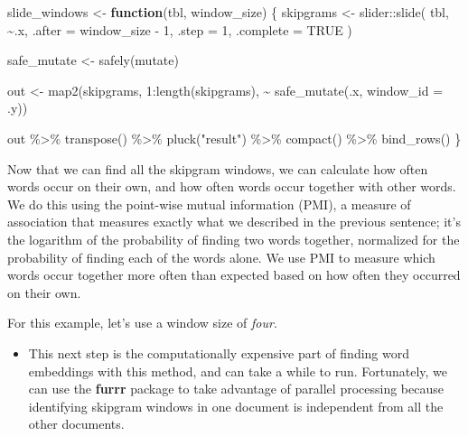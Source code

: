 \documentclass[
]{krantz}
\makeatletter
\newenvironment{Shaded}{\begin{snugshade}}{\end{snugshade}}
\newcommand{\AttributeTok}[1]{\textcolor[rgb]{0.77,0.63,0.00}{#1}}
\newcommand{\ConstantTok}[1]{\textcolor[rgb]{0.00,0.00,0.00}{#1}}
\newcommand{\ControlFlowTok}[1]{\textcolor[rgb]{0.13,0.29,0.53}{\textbf{#1}}}
\newcommand{\DecValTok}[1]{\textcolor[rgb]{0.00,0.00,0.81}{#1}}
\newcommand{\FunctionTok}[1]{\textcolor[rgb]{0.00,0.00,0.00}{#1}}
\newcommand{\NormalTok}[1]{#1}
\newcommand{\OtherTok}[1]{\textcolor[rgb]{0.56,0.35,0.01}{#1}}
\newcommand{\SpecialCharTok}[1]{\textcolor[rgb]{0.00,0.00,0.00}{#1}}
\newcommand{\StringTok}[1]{\textcolor[rgb]{0.31,0.60,0.02}{#1}}
\newenvironment{kframe}{%
\medskip{}
\setlength{\fboxsep}{.8em}
 \def\at@end@of@kframe{}%
 \ifinner\ifhmode%
  \def\at@end@of@kframe{\end{minipage}}%
  \begin{minipage}{\columnwidth}%
 \fi\fi%
 \def\FrameCommand##1{\hskip\@totalleftmargin \hskip-\fboxsep
 \colorbox{shadecolor}{##1}\hskip-\fboxsep
     \hskip-\linewidth \hskip-\@totalleftmargin \hskip\columnwidth}%
 \MakeFramed {\advance\hsize-\width
   \@totalleftmargin\z@ \linewidth\hsize
   \@setminipage}}%
 {\par\unskip\endMakeFramed%
 \at@end@of@kframe}
\renewenvironment{Shaded}{\begin{kframe}}{\end{kframe}}
\newenvironment{rmdblock}[1]
  {\begin{shaded*}
  \begin{itemize}[left = -1cm, labelsep = 1cm]
  \renewcommand{\labelitemi}{
    \raisebox{-.7\height}[0pt][0pt]{
      {\setkeys{Gin}{width=3em,keepaspectratio}\texttt{[image: images/\#1]}}
    }
  }
 
  \item
  }
  {
  \end{itemize}
  \end{shaded*}
  }
\newenvironment{rmdpackage}
  {\begin{rmdblock}{package}}
  {\end{rmdblock}}
\makeatother
\begin{document}
\begin{Shaded}
\begin{Highlighting}[]
\NormalTok{slide\_windows }\OtherTok{\textless{}{-}} \ControlFlowTok{function}\NormalTok{(tbl, window\_size) \{}
\NormalTok{  skipgrams }\OtherTok{\textless{}{-}}\NormalTok{ slider}\SpecialCharTok{::}\FunctionTok{slide}\NormalTok{(}
\NormalTok{    tbl, }
    \SpecialCharTok{\textasciitilde{}}\NormalTok{.x, }
    \AttributeTok{.after =}\NormalTok{ window\_size }\SpecialCharTok{{-}} \DecValTok{1}\NormalTok{, }
    \AttributeTok{.step =} \DecValTok{1}\NormalTok{, }
    \AttributeTok{.complete =} \ConstantTok{TRUE}
\NormalTok{  )}
  
\NormalTok{  safe\_mutate }\OtherTok{\textless{}{-}} \FunctionTok{safely}\NormalTok{(mutate)}
  
\NormalTok{  out }\OtherTok{\textless{}{-}} \FunctionTok{map2}\NormalTok{(skipgrams,}
              \DecValTok{1}\SpecialCharTok{:}\FunctionTok{length}\NormalTok{(skipgrams),}
              \SpecialCharTok{\textasciitilde{}} \FunctionTok{safe\_mutate}\NormalTok{(.x, }\AttributeTok{window\_id =}\NormalTok{ .y))}

\NormalTok{  out }\SpecialCharTok{\%\textgreater{}\%}
    \FunctionTok{transpose}\NormalTok{() }\SpecialCharTok{\%\textgreater{}\%}
    \FunctionTok{pluck}\NormalTok{(}\StringTok{"result"}\NormalTok{) }\SpecialCharTok{\%\textgreater{}\%}
    \FunctionTok{compact}\NormalTok{() }\SpecialCharTok{\%\textgreater{}\%}
    \FunctionTok{bind\_rows}\NormalTok{()}
\NormalTok{\}}
\end{Highlighting}
\end{Shaded}

Now that we can find all the skipgram windows, we can calculate how often words occur on their own, and how often words occur together with other words. We do this using the point-wise mutual information (PMI), a measure of association that measures exactly what we described in the previous sentence; it's the logarithm of the probability of finding two words together, normalized for the probability of finding each of the words alone. We use PMI to measure which words occur together more often than expected based on how often they occurred on their own.

For this example, let's use a window size of \emph{four}.

\begin{rmdpackage}
This next step is the computationally expensive part of finding word embeddings with this method, and can take a while to run. Fortunately, we can use the \textbf{furrr} package \citep{Vaughan2018} to take advantage of parallel processing because identifying skipgram windows in one document is independent from all the other documents.
\end{rmdpackage}
\end{document}
